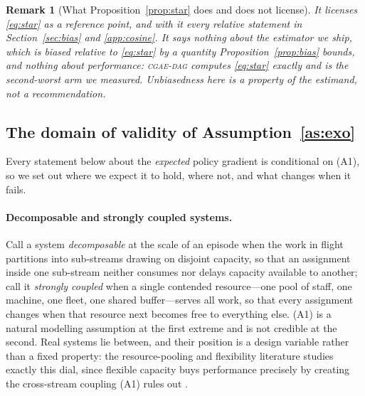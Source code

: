 \documentclass[review,authoryear,3p,times]{elsarticle}
\newtheorem{remark}{Remark}
\newcommand{\cdag}{\textsc{cgae-dag}}          %
\begin{document}
\begin{remark}[What Proposition~\ref{prop:star} does and does not license]
It licenses \eqref{eq:star} as a reference point, and with it every
\emph{relative} statement in Section~\ref{sec:bias} and
\ref{app:cosine}. It says nothing about the estimator we ship, which is
biased relative to \eqref{eq:star} by a quantity Proposition~\ref{prop:bias}
bounds, and nothing about performance: \cdag{} computes \eqref{eq:star} exactly
and is the second-worst arm we measured. Unbiasedness here is a property of the
estimand, not a recommendation.
\end{remark}

\subsection{The domain of validity of Assumption~\ref{as:exo}}
\label{sec:a1scope}

Every statement below about the \emph{expected} policy gradient is conditional
on (A1), so we set out where we expect it to hold, where not, and what changes
when it fails.

\paragraph{Decomposable and strongly coupled systems.} Call a system
\emph{decomposable} at the scale of an episode when the work in flight
partitions into sub-streams drawing on disjoint capacity, so that an assignment
inside one sub-stream neither consumes nor delays capacity available to another;
call it \emph{strongly coupled} when a single contended resource---one pool of
staff, one machine, one fleet, one shared buffer---serves all work, so that
every assignment changes when that resource next becomes free to everything
else. (A1) is a natural modelling assumption at the first extreme and is not
credible at the second. Real systems lie between, and their position is a design
variable rather than a fixed property: the resource-pooling and flexibility
literature studies exactly this dial, since flexible capacity buys performance
precisely by creating the cross-stream coupling (A1) rules out
\citep{pooling_flexibility}.
\end{document}
